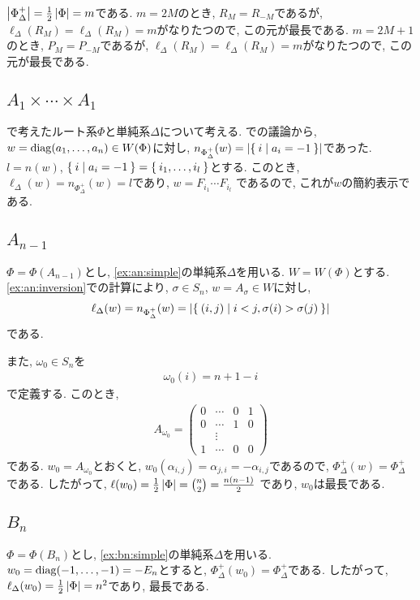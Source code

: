 $\left|\Phi_\Delta^+\right|=\frac{1}{2}\left|\Phi\right|=m$である.
$m=2M$のとき,
$R_{M}=R_{-M}$であるが,
$\ell_\Delta(R_{M})=\ell_\Delta(R_{M})=m$がなりたつので,
この元が最長である.
$m=2M+1$のとき,
$P_{M}=P_{-M}$であるが,
$\ell_\Delta(R_{M})=\ell_\Delta(R_{M})=m$がなりたつので,
この元が最長である.

\subsection{$A_{1}\times\cdots\times A_{1}$}
で考えたルート系$\Phi$と単純系$\Delta$について考える.
での議論から,
$w=\operatorname{diag}(a_1,\ldots,a_n)\in W(\Phi)$に対し,
$n_{\Phi_\Delta^+}(w)=\left|\Set{i|a_i=-1}\right|$であった.
$l=n(w)$,
$\Set{i|a_i=-1}=\Set{i_1,\ldots,i_l}$とする.
このとき, $\ell_\Delta(w)=n_{\Phi_\Delta^+}(w)=l$であり,
$w=F_{i_1}\cdots F_{i_l}$
であるので, これが$w$の簡約表示である.

\subsection{$A_{n-1}$}
\label{ex:an:len}
$\Phi=\Phi(A_{n-1})$とし,
\cref{ex:an:simple}の単純系$\Delta$を用いる.
$W=W(\Phi)$とする.
\cref{ex:an:inversion}での計算により,
$\sigma\in S_n$, $w=A_\sigma\in W$に対し,
\begin{align*}
  \ell_\Delta(w)=n_{\Phi_\Delta^+}(w)=\left|\Set{(i,j)|i<j, \sigma(i)>\sigma(j)}\right|
\end{align*}
である.

また,
$\omega_0\in S_n$を
\begin{align*}
\omega_0(i)=n+1-i
\end{align*}
で定義する.  このとき,
\begin{align*}
  A_{\omega_0}=
  \begin{pmatrix}
    0&\cdots&0&1\\
    0&\cdots&1&0\\
    &\vdots&&\\
    1&\cdots&0&0
  \end{pmatrix}
\end{align*}
である.  $w_0=A_{\omega_0}$とおくと,
$w_0(\alpha_{i,j})=\alpha_{j,i}=-\alpha_{i,j}$であるので,
$\Phi_\Delta^+(w)=\Phi_\Delta^+$である.
したがって, $\ell(w_0)=\frac{1}{2}\left|\Phi\right|=\binom{n}{2}=\frac{n(n-1)}{2}$
であり, $w_0$は最長である.

\subsection{$B_{n}$}
\label{ex:bn:len}
$\Phi=\Phi(B_n)$とし,
\cref{ex:bn:simple}の単純系$\Delta$を用いる.
$w_0=\operatorname{diag}(-1,\ldots,-1)=-E_n$とすると,
$\Phi_\Delta^+(w_0)=\Phi_\Delta^+$である.
したがって, $\ell_\Delta(w_0)=\frac{1}{2}\left|\Phi\right|=n^2$であり,
最長である.

